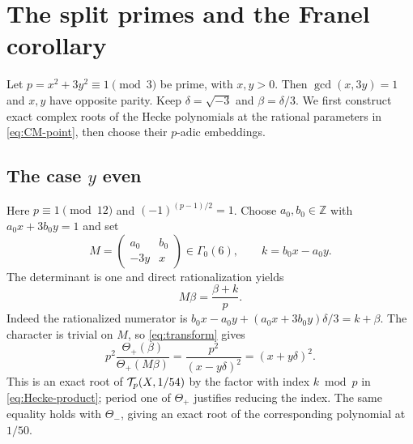 \documentclass[11pt,a4paper]{article}
\theoremstyle{remark}\newtheorem{remark}[theorem]{Remark}
\newcommand{\Z}{\mathbb Z}\newcommand{\Q}{\mathbb Q}
\newcommand{\smat}[4]{\begin{pmatrix}#1&#2\\#3&#4\end{pmatrix}}
\begin{document}
\section{The split primes and the Franel corollary}\label{sec:split}
Let $p=x^2+3y^2\equiv1\pmod3$ be prime, with $x,y>0$.
Then $\gcd(x,3y)=1$ and $x,y$ have opposite parity.
Keep $\delta=\sqrt{-3}$ and $\beta=\delta/3$.
We first construct exact complex roots of the Hecke polynomials at the
rational parameters in \eqref{eq:CM-point}, then choose their $p$-adic
embeddings.

\subsection{The case \texorpdfstring{$y$}{y} even}
Here $p\equiv1\pmod{12}$ and $(-1)^{(p-1)/2}=1$.
Choose $a_0,b_0\in\Z$ with $a_0x+3b_0y=1$ and set
\begin{equation}\label{eq:CM-even}
 M=\smat{a_0}{b_0}{-3y}{x}\in\Gamma_0(6),\qquad
 k=b_0x-a_0y.
\end{equation}
The determinant is one and direct rationalization yields
\begin{equation}\label{eq:CM-image-even}
 M\beta=\frac{\beta+k}{p}.
\end{equation}
Indeed the rationalized numerator is
$b_0x-a_0y+(a_0x+3b_0y)\delta/3=k+\beta$.
The character is trivial on $M$, so \eqref{eq:transform} gives
\begin{equation}\label{eq:root-even}
 p^2\frac{\Theta_+(\beta)}{\Theta_+(M\beta)}
 =\frac{p^2}{(x-y\delta)^2}=(x+y\delta)^2.
\end{equation}
This is an exact root of $\mathcal T_p(X,1/54)$ by the factor with index
$k\bmod p$ in \eqref{eq:Hecke-product}; period one of $\Theta_+$ justifies
reducing the index. The same equality holds with $\Theta_-$, giving an
exact root of the corresponding polynomial at $1/50$.
\end{document}
